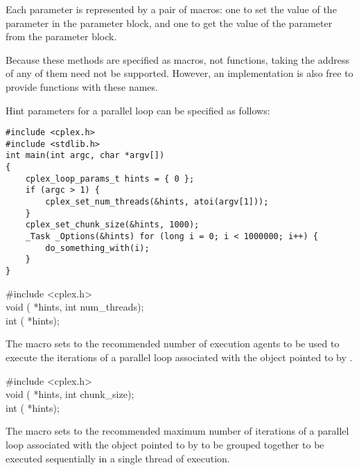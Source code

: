 \pnum
Each parameter is represented by a pair of macros:
one to set the value of the parameter in the parameter block,
and one to get the value of the parameter from the parameter block.

\begin{note}
Because these methods are specified as macros,
not functions,
taking the address of any of them need not be supported.
However, an implementation is also free
to provide functions with these names.
\end{note}

\begin{example}
Hint parameters for a parallel loop can be specified as follows:
\begin{verbatim}
#include <cplex.h>
#include <stdlib.h>
int main(int argc, char *argv[])
{
    cplex_loop_params_t hints = { 0 };
    if (argc > 1) {
        cplex_set_num_threads(&hints, atoi(argv[1]));
    }
    cplex_set_chunk_size(&hints, 1000);
    _Task _Options(&hints) for (long i = 0; i < 1000000; i++) {
        do_something_with(i);
    }
}
\end{verbatim}
\end{example}

\begin{ttfamily}
\#include <cplex.h>\\
void ( *hints, int num_threads);\\
int ( *hints);
\end{ttfamily}

\pnum
The
macro sets to
the recommended number of execution agents to be used
to execute the iterations of a parallel loop
associated with the object pointed to by
.

\begin{ttfamily}
\#include <cplex.h>\\
void ( *hints, int chunk_size);\\
int ( *hints);
\end{ttfamily}

\pnum
The
macro sets to
the recommended maximum number of iterations
of a parallel loop associated with the object pointed to by
to be grouped together to be executed sequentially
in a single thread of execution.

